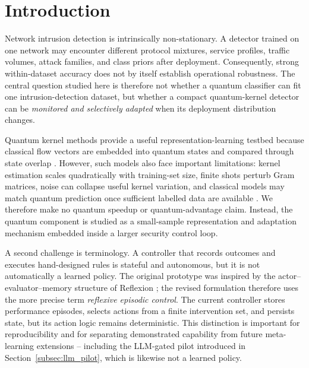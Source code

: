 \documentclass[conference]{IEEEtran}
\begin{document}
\section{Introduction}
\label{sec:introduction}

Network intrusion detection is intrinsically non-stationary. A detector
trained on one network may encounter different protocol mixtures, service
profiles, traffic volumes, attack families, and class priors after
deployment. Consequently, strong within-dataset accuracy does not by
itself establish operational robustness. The central question studied
here is therefore not whether a quantum classifier can fit one
intrusion-detection dataset, but whether a compact quantum-kernel detector
can be \emph{monitored and selectively adapted} when its deployment
distribution changes.

Quantum kernel methods provide a useful representation-learning testbed
because classical flow vectors are embedded into quantum states and
compared through state overlap \cite{havlicek2019, schuld2019}. However,
such models also face important limitations: kernel estimation scales
quadratically with training-set size, finite shots perturb Gram matrices,
noise can collapse useful kernel variation, and classical models may match
quantum prediction once sufficient labelled data are available
\cite{huang2021, cerezo2022, thanasilp2024}. We therefore make no quantum
speedup or quantum-advantage claim. Instead, the quantum component is
studied as a small-sample representation and adaptation mechanism embedded
inside a larger security control loop.

A second challenge is terminology. A controller that records outcomes and
executes hand-designed rules is stateful and autonomous, but it is not
automatically a learned policy. The original prototype was inspired by the
actor--evaluator--memory structure of Reflexion \cite{shinn2023}; the
revised formulation therefore uses the more precise term \emph{reflexive
episodic control}. The current controller stores performance episodes,
selects actions from a finite intervention set, and persists state, but
its action logic remains deterministic. This distinction is important for
reproducibility and for separating demonstrated capability from future
meta-learning extensions -- including the LLM-gated pilot introduced in
Section~\ref{subsec:llm_pilot}, which is likewise not a learned policy.
\end{document}
